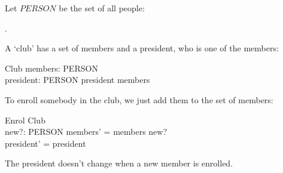 
\noindent Let $PERSON$ be the set of all people:
\begin{zed}
[PERSON].
\end{zed}
A ‘club’ has a set of members and a president, who is
one of the members:
\begin{schema}{Club}
members: \power PERSON \\
president: PERSON
\where
president \subseteq members
\end{schema}
To enroll somebody in the club, we just add them
to the set of members:
\begin{schema}{Enrol}
\Delta Club \\
new?: PERSON
\where
members’ = members \cup new? \\
president’ = president
\end{schema}
The president doesn’t change when a new member
is enrolled.
